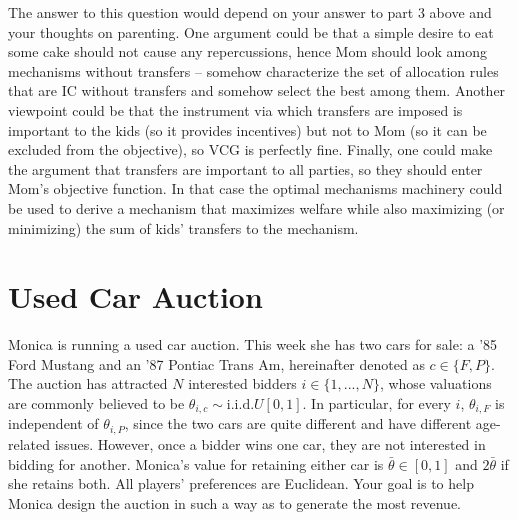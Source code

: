 \documentclass[a4paper]{article}
\begin{document}
\begin{enumerate}
	The answer to this question would depend on your answer to part 3 above and your thoughts on parenting. One argument could be that a simple desire to eat some cake should not cause any repercussions, hence Mom should look among mechanisms without transfers -- somehow characterize the set of allocation rules that are IC without transfers and somehow select the best among them. Another viewpoint could be that the instrument via which transfers are imposed is important to the kids (so it provides incentives) but not to Mom (so it can be excluded from the objective), so VCG is perfectly fine. Finally, one could make the argument that transfers are important to all parties, so they should enter Mom's objective function. In that case the optimal mechanisms machinery could be used to derive a mechanism that maximizes welfare while also maximizing (or minimizing) the sum of kids' transfers to the mechanism.
\end{enumerate}
\fi



\section{Used Car Auction}
Monica is running a used car auction. This week she has two cars for sale: a '85 Ford Mustang and an '87 Pontiac Trans Am, hereinafter denoted as $c \in \{F,P\}$. The auction has attracted $N$ interested bidders $i\in \{1,...,N\}$, whose valuations are commonly believed to be $\theta_{i,c} \sim \text{i.i.d.}U[0,1]$. In particular, for every $i$, $\theta_{i,F}$ is independent of $\theta_{i,P}$, since the two cars are quite different and have different age-related issues. However, once a bidder wins one car, they are not interested in bidding for another. Monica's value for retaining either car is $\bar{\theta} \in [0,1]$ and $2\bar{\theta}$ if she retains both. All players' preferences are Euclidean. Your goal is to help Monica design the auction in such a way as to generate the most revenue.
\end{document}
